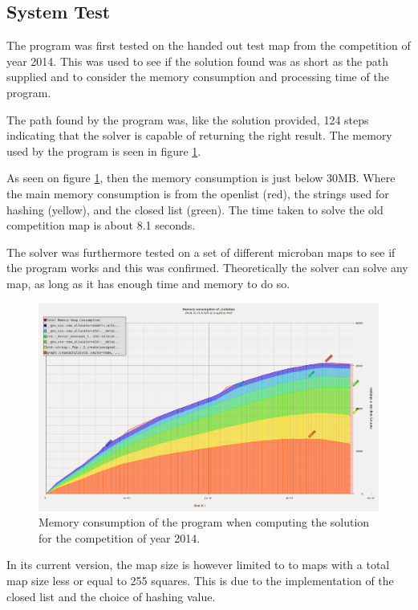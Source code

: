 \subsection{System Test}


The program was first tested on the handed out test map from the competition of year 2014.
This was used to see if the solution found was as short as the path supplied and to consider the memory consumption and processing time of the program.

The path found by the program was, like the solution provided, 124 steps indicating that the solver is capable of returning the right result.
The memory used by the program is seen in figure \ref{fig:memoryconsumption2014}.


As seen on figure \ref{fig:memoryconsumption2014}, then the memory consumption is just below 30MB.
Where the main memory consumption is from the openlist (red), the strings used for hashing (yellow), and the closed list (green).
The time taken to solve the old competition map is about 8.1 seconds.

The solver was furthermore tested on a set of different microban maps to see if the program works and this was confirmed.
Theoretically the solver can solve any map, as long as it has enough time and memory to do so.


\begin{figure}[H]
\centering
\includegraphics[width = 0.8 \linewidth]{graphics/memoryconsumption.png}
\caption{Memory consumption of the program when computing the solution for the competition of year 2014.}
\label{fig:memoryconsumption2014}
\end{figure}

In its current version, the map size is however limited to to maps with a total map size less or equal to 255 squares.
This is due to the implementation of the closed list and the choice of hashing value.




